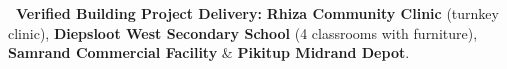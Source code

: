 \vfill

\noindent
\begin{tcolorbox}[enhanced, colback=white, colframe=mhnavy, boxrule=0.8pt, arc=3pt, left=8pt, right=8pt, top=6pt, bottom=6pt, drop shadow=black!3]
    {\fontsize{8pt}{10.6pt}\selectfont\color{mhnavy}\bfseries\faCheckCircle\ Verified Building Project Delivery:}\quad
    {\fontsize{8pt}{10.6pt}\selectfont\color{mhtext}
    \textbf{Rhiza Community Clinic} (turnkey clinic), \textbf{Diepsloot West Secondary School} (4 classrooms with furniture), \textbf{Samrand Commercial Facility} \& \textbf{Pikitup Midrand Depot}.
    }
\end{tcolorbox}

\clearpage
